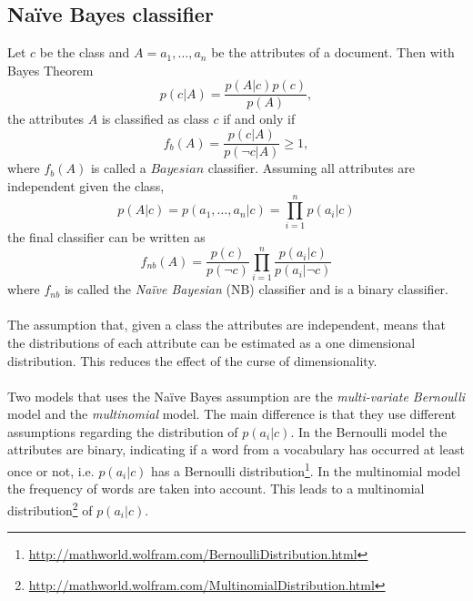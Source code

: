 \subsection{Naïve Bayes classifier}
Let $c$ be the class and $A = a_1, \dots ,a_n$ be the attributes of a document. Then with Bayes Theorem
\begin{equation}
p(c|A)=\frac{p(A|c)p(c)}{p(A)},
\end{equation}
the attributes $A$ is classified as class $c$ if and only if
\begin{equation}
f_b(A)=\frac{p(c|A)}{p(\neg c|A)} \geq 1,
\end{equation}
where $f_b(A)$ is called a $Bayesian$ classifier. Assuming all attributes are independent given the class, 
\[
p(A|c)=p(a_1,\dots ,a_n | c) = \prod_{i=1}^n p(a_i|c)
\]
the final classifier can be written as
\begin{equation}
f_{nb}(A) = \frac{p(c)}{p(\neg c)}\prod_{i=1}^n\frac{p(a_i|c)}{p(a_i|\neg c)}
\end{equation}
where $f_{nb}$ is called the \emph{Naïve Bayesian} (NB) classifier and is a binary classifier.\\\\
The assumption that, given a class the attributes are independent, means that the distributions of each attribute can be estimated as a one dimensional distribution. This reduces the effect of the curse of dimensionality.\cite{Zhang04optimality}\\\\
Two models that uses the Naïve Bayes assumption are the \emph{multi-variate Bernoulli} model and the \emph{multinomial} model. The main difference is that they use different assumptions regarding the distribution of $p(a_i|c)$. In the Bernoulli model the attributes are binary, indicating if a word from a vocabulary has occurred at least once or not, i.e. $p(a_i|c)$ has a Bernoulli distribution\footnote{\url{http://mathworld.wolfram.com/BernoulliDistribution.html}}. In the multinomial model the frequency of words are taken into account. This leads to a multinomial distribution\footnote{\url{http://mathworld.wolfram.com/MultinomialDistribution.html}} of $p(a_i|c)$.\cite{McCallum98acomparison}